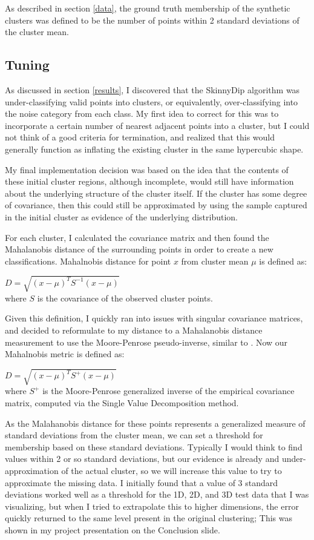 \documentclass{sig-alternate-05-2015}
\begin{document}
As described in section \ref{data}, the ground truth membership of the synthetic clusters was defined to be the number of points within 2 standard deviations of the cluster mean.
\subsection{Tuning}
As discussed in section \ref{results}, I discovered that the SkinnyDip algorithm was under-classifying valid points into clusters, or equivalently, over-classifying into the noise category from each class. My first idea to correct for this was to incorporate a certain number of nearest adjacent points into a cluster, but I could not think of a good criteria for termination, and realized that this would generally function as inflating the existing cluster in the same hypercubic shape.

My final implementation decision was based on the idea that the contents of these initial cluster regions, although incomplete, would still have information about the underlying structure of the cluster itself. If the cluster has some degree of covariance, then this could still be approximated by using the sample captured in the initial cluster as evidence of the underlying distribution.

For each cluster, I calculated the covariance matrix and then found the Mahalanobis distance of the surrounding points in order to create a new classifications. Mahalnobis distance for point $x$ from cluster mean $\mu$ is defined as:
\begin{center}
$D = \sqrt{(x-\mu)^TS^{-1}(x-\mu)}$ \\
where $S$ is the covariance of the observed cluster points.
\end{center}
Given this definition, I quickly ran into issues with singular covariance matrices, and decided to reformulate to my distance to a Mahalanobis distance measurement to use the Moore-Penrose pseudo-inverse, similar to \cite{Mahalnobis}. Now our Mahalnobis metric is defined as:
\begin{center}
$D = \sqrt{(x-\mu)^TS^+(x-\mu)}$ \\
where $S^+$ is the Moore-Penrose generalized inverse of the empirical covariance matrix, computed via the Single Value Decomposition method.
\end{center}
As the Malahanobis distance for these points represents a generalized measure of standard deviations from the cluster mean, we can set a threshold for membership based on these standard deviations. Typically I would think to find values within 2 or so standard deviations, but our evidence is already and under-approximation of the actual cluster, so we will increase this value to try to approximate the missing data. I initially found that a value of 3 standard deviations worked well as a threshold for the 1D, 2D, and 3D test data that I was visualizing, but when I tried to extrapolate this to higher dimensions, the error quickly returned to the same level present in the original clustering; This was shown in my project presentation on the Conclusion slide. 
\end{document}
